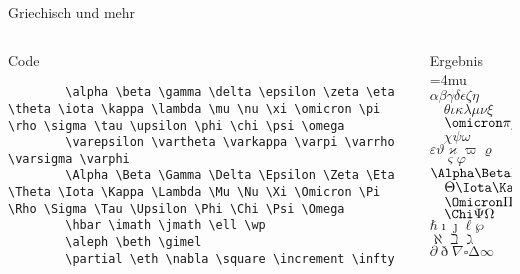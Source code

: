 \begin{frame}[fragile]{Griechisch und mehr}
  \begin{columns}[onlytextwidth, t]
    \begin{column}{0.70\textwidth}
      \begin{block}{Code}
        \begin{lstlisting}
        \alpha \beta \gamma \delta \epsilon \zeta \eta \theta \iota \kappa \lambda \mu \nu \xi \omicron \pi \rho \sigma \tau \upsilon \phi \chi \psi \omega
        \varepsilon \vartheta \varkappa \varpi \varrho \varsigma \varphi
        \Alpha \Beta \Gamma \Delta \Epsilon \Zeta \Eta \Theta \Iota \Kappa \Lambda \Mu \Nu \Xi \Omicron \Pi \Rho \Sigma \Tau \Upsilon \Phi \Chi \Psi \Omega
        \hbar \imath \jmath \ell \wp
        \aleph \beth \gimel
        \partial \eth \nabla \square \increment \infty
        \end{lstlisting}
      \end{block}
    \end{column}
    \begin{column}{0.26\textwidth}
      \begin{block}{Ergebnis}
        \Umathordordspacing\textstyle=4mu
        $\alpha \beta \gamma \delta \epsilon \zeta \eta$ \\
        $\quad \theta \iota \kappa \lambda \mu \nu \xi$ \\
        $\quad \omicron \pi \rho \sigma \tau \upsilon \phi$ \\
        $\quad \chi \psi \omega$ \\
        $\varepsilon \vartheta \varkappa \varpi \varrho$ \\
        $\quad \varsigma \varphi$ \\
        $\Alpha \Beta \Gamma \Delta \Epsilon \Zeta \Eta$ \\
        $\quad \Theta \Iota \Kappa \Lambda \Mu \Nu \Xi$ \\
        $\quad \Omicron \Pi \Rho \Sigma \Tau \Upsilon \Phi$ \\
        $\quad \Chi \Psi \Omega$ \\
        $\hbar \imath \jmath \ell \wp$ \\
        $\aleph \beth \gimel$ \\
        $\partial \eth \nabla \square \increment \infty$
      \end{block}
    \end{column}
  \end{columns}
\end{frame}

